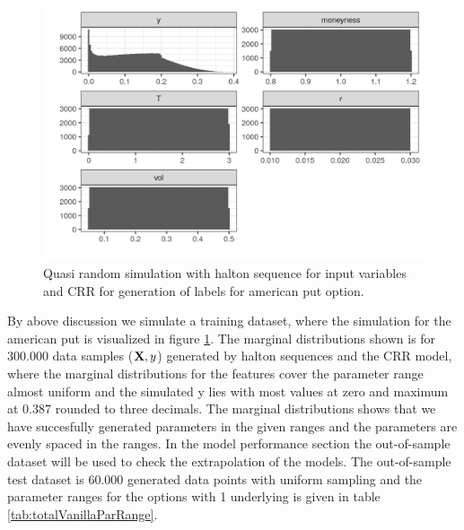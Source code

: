 \begin{figure}[th]
\centering
\includegraphics{Figures/marginalAmerPut.png}
\decoRule
\caption[Marginal Distributions For American Put]{Quasi random simulation with halton sequence for input variables and CRR for generation of labels for american put option.}
\label{fig:marginalAmerPut}
\end{figure}

By above discussion we simulate a training dataset, where the simulation for the american put is visualized in figure \ref{fig:marginalAmerPut}. The marginal distributions shown is for $300.000$ data samples ($\mathbf{X},y$) generated by halton sequences and the CRR model, where the marginal distributions for the features cover the parameter range almost uniform and the simulated y lies with most values at zero and maximum at 0.387 rounded to three decimals. The marginal distributions shows that we have succesfully generated parameters in the given ranges and the parameters are evenly spaced in the ranges. In the model performance section the out-of-sample dataset will be used to check the extrapolation of the models. The out-of-sample test dataset is 60.000 generated data points with uniform sampling and the parameter ranges for the options with 1 underlying is given in table \ref{tab:totalVanillaParRange}.


